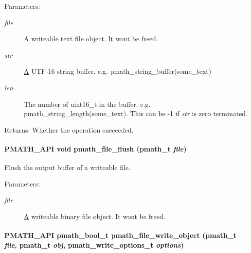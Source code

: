 \begin{Desc}
\item[Parameters:]
\begin{description}
\item[{\em file}]\hyperlink{class_a}{A} writeable text file object. It wont be freed. \item[{\em str}]\hyperlink{class_a}{A} UTF-16 string buffer. e.g. pmath\_\-string\_\-buffer(some\_\-text) \item[{\em len}]The number of uint16\_\-t in the buffer. e.g. pmath\_\-string\_\-length(some\_\-text). This can be -1 if {\em str\/} is zero terminated. \end{description}
\end{Desc}
\begin{Desc}
\item[Returns:]Whether the operation succeeded. \end{Desc}
\hypertarget{group__file__api_g039eb11d9dd85af6699565c6f0f0daa1}{
\paragraph[{pmath\_\-file\_\-flush}]{\setlength{\rightskip}{0pt plus 5cm}PMATH\_\-API void pmath\_\-file\_\-flush ({\bf pmath\_\-t} {\em file})}\hfill}
\label{group__file__api_g039eb11d9dd85af6699565c6f0f0daa1}


Flush the output buffer of a writeable file. 

\begin{Desc}
\item[Parameters:]
\begin{description}
\item[{\em file}]\hyperlink{class_a}{A} writeable binary file object. It wont be freed. \end{description}
\end{Desc}
\hypertarget{group__file__api_gf6b8233107d3fb27e9fdabfacc8595d1}{
\paragraph[{pmath\_\-file\_\-write\_\-object}]{\setlength{\rightskip}{0pt plus 5cm}PMATH\_\-API {\bf pmath\_\-bool\_\-t} pmath\_\-file\_\-write\_\-object ({\bf pmath\_\-t} {\em file}, \/  {\bf pmath\_\-t} {\em obj}, \/  {\bf pmath\_\-write\_\-options\_\-t} {\em options})}\hfill}
\label{group__file__api_gf6b8233107d3fb27e9fdabfacc8595d1}


